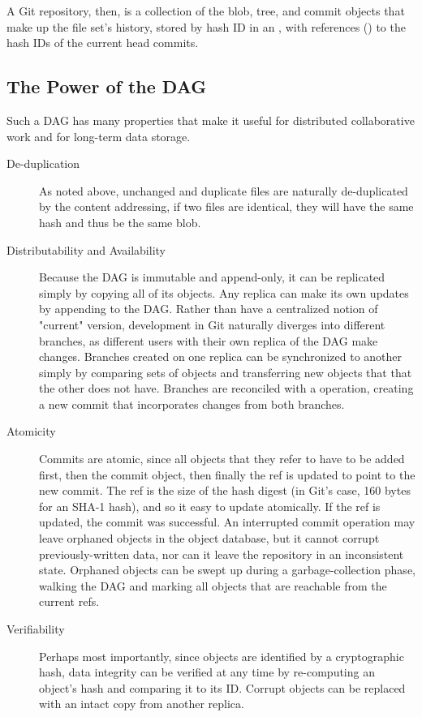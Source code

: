 A Git repository, then, is a collection of the blob, tree, and commit objects
that make up the file set's history, stored by hash ID in an , with references () to the hash IDs of the current head
commits\cite{git_initial_readme}.

%

\subsection{The Power of the DAG}

Such a DAG has many properties that make it useful for distributed collaborative
work and for long-term data storage.

\begin{description}

    \item[De-duplication] As noted above, unchanged and duplicate files are
        naturally de-duplicated by the content addressing, if two files are
        identical, they will have the same hash and thus be the same blob.

    \item[Distributability and Availability] Because the DAG is immutable and
        append-only, it can be replicated simply by copying all of its objects.
        Any replica can make its own updates by appending to the DAG. Rather
        than have a centralized notion of "current" version, development in Git
        naturally diverges into different branches, as different users with
        their own replica of the DAG make changes. Branches created on one
        replica can be synchronized to another simply by comparing sets of
        objects and transferring new objects that that the other does not have.
        Branches are reconciled with a  operation, creating a new
        commit that incorporates changes from both branches.

    \item[Atomicity] Commits are atomic, since all objects that they refer to
        have to be added first, then the commit object, then finally the ref is
        updated to point to the new commit. The ref is the size of the hash
        digest (in Git's case, \num{160} bytes for an SHA-1 hash), and so it
        easy to update atomically. If the ref is updated, the commit was
        successful. An interrupted commit operation may leave orphaned objects
        in the object database, but it cannot corrupt previously-written data,
        nor can it leave the repository in an inconsistent state. Orphaned
        objects can be swept up during a garbage-collection phase, walking the
        DAG and marking all objects that are reachable from the current refs.

    \item[Verifiability] Perhaps most importantly, since objects are identified
        by a cryptographic hash, data integrity can be verified at any time by
        re-computing an object's hash and comparing it to its ID. Corrupt
        objects can be replaced with an intact copy from another replica.

\end{description}

